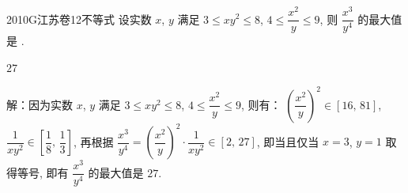 
\begin{problem}{2010}{G}{江苏卷}{12}{不等式}
设实数 $ x $, $ y $ 满足 $ 3 \le xy^2 \le 8 $, $ 4 \le \dfrac{x^2}{y} \le 9 $, 则 $ \dfrac{x^3}{y^4} $ 的最大值是 \underline{\hspace{4em}}.
\end{problem}

\begin{answer}
$ 27 $
\end{answer}

\begin{solutions}
解：因为实数 $ x $, $ y $ 满足 $ 3 \le xy^2 \le 8 $, $ 4 \le \dfrac{x^2}{y} \le 9 $,  
则有：  
$ \left( \dfrac{x^2}{y} \right)^2 \in [16,\, 81] $, $ \dfrac{1}{xy^2} \in \left[ \dfrac{1}{8},\, \dfrac{1}{3} \right] $,  
再根据 $ \dfrac{x^3}{y^4} = \left( \dfrac{x^2}{y} \right)^2 \cdot \dfrac{1}{xy^2} \in [2,\, 27] $, 即当且仅当 $ x = 3 $, $ y = 1 $ 取得等号,  
即有 $ \dfrac{x^3}{y^4} $ 的最大值是 $ 27 $.
\end{solutions}